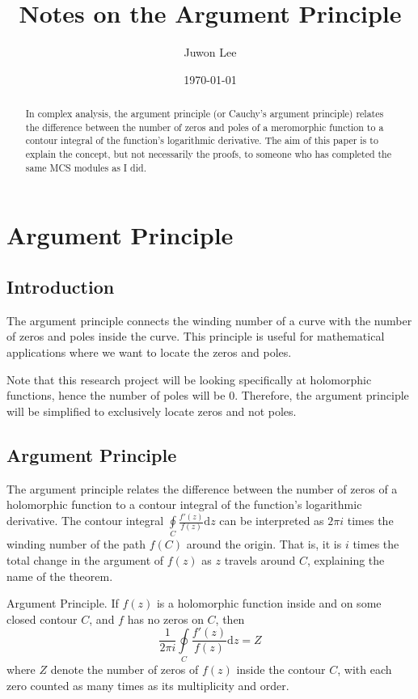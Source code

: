 \documentclass[11pt,reqno,oneside,a4paper]{article}
\author{Juwon Lee}
\title{Notes on the Argument Principle}
\date{\today}
\begin{document}
\maketitle
\thispagestyle{fancy}

\begin{abstract}
In complex analysis, the argument principle (or Cauchy's argument principle) relates the difference between the number of zeros and poles of a meromorphic function to a contour integral of the function's logarithmic derivative. 
The aim of this paper is to explain the concept, but not necessarily the proofs, to someone who has completed the same MCS modules as I did.
\end{abstract}

\section{Argument Principle}
\subsection{Introduction}
The argument principle connects the winding number of a curve with the number of zeros and poles inside the curve. This principle is useful for mathematical applications where we want to locate the zeros and poles. 

\begin{asm}
Note that this research project will be looking specifically at holomorphic functions, hence the number of poles will be $0.$ Therefore, the argument principle will be simplified to exclusively locate zeros and not poles.
\end{asm}

\subsection{Argument Principle}
The argument principle relates the difference between the number of zeros of a holomorphic function to a contour integral of the function's logarithmic derivative. 
The contour integral $\oint\limits_{C} \frac{f'(z)}{f(z)}\mathrm{d}z $ can be interpreted as $2\pi i$ times the winding number of the path $f(C)$ around the origin. 
That is, it is $i$ times the total change in the argument of $f(z)$ as $z$ travels around $C$, explaining the name of the theorem. 
\begin{thm}{Argument Principle.}
If $f(z)$ is a holomorphic function inside and on some closed contour $C$, and $f$ has no zeros on $C$, then 
$$ \frac{1}{2\pi i} \oint\limits_{C} \frac{f'(z)}{f(z)}\mathrm{d}z = Z$$
where $Z$ denote the number of zeros of $f(z)$ inside the contour $C$, with each zero counted as many times as its multiplicity and order. 
\end{thm}
\end{document}
